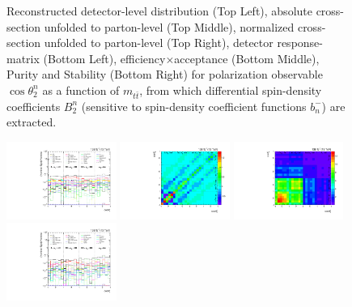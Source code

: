 \begin{refsection}
\begin{figure}[htb]
\begin{center}
\caption{Reconstructed detector-level distribution (Top Left), absolute cross-section unfolded to parton-level (Top Middle), normalized cross-section unfolded to parton-level (Top Right), detector response-matrix (Bottom Left), efficiency$\times$acceptance (Bottom Middle), Purity and Stability (Bottom Right) for polarization observable $\cos\theta_{2}^{n}$ as a function of $m_{t\bar{t}}$, from which differential spin-density coefficients $B_{2}^{n}$ (sensitive to spin-density coefficient functions $b_n^{-}$) are extracted.}
\label{fig:b2n_mttbar}
\end{center}
\end{figure}
\clearpage
\begin{figure}[htb]
\begin{center}
 \includegraphics[width=0.32\textwidth]{fig_fullRun2UL/unfolding/combined/deltaSystCombinedlog_rebinnedB_b2n_mttbar.pdf}
 \includegraphics[width=0.32\textwidth]{fig_fullRun2UL/unfolding/combined/StatCovMatrix_rebinnedB_b2n_mttbar.pdf}
 \includegraphics[width=0.32\textwidth]{fig_fullRun2UL/unfolding/combined/TotalSystCovMatrix_rebinnedB_b2n_mttbar.pdf} \\
 \includegraphics[width=0.32\textwidth]{fig_fullRun2UL/unfolding/combined/deltaSystCombinedlogNorm_rebinnedB_b2n_mttbar.pdf}

\end{center}
\end{figure}
\end{refsection}

